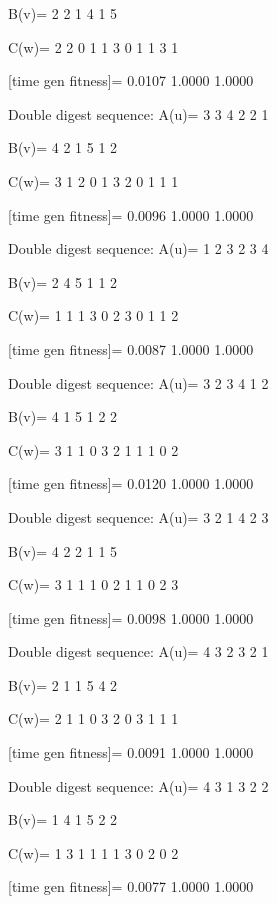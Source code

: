 B(v)=
     2     2     1     4     1     5

C(w)=
     2     2     0     1     1     3     0     1     1     3     1

[time gen fitness]=
    0.0107    1.0000    1.0000

Double digest sequence:
A(u)=
     3     3     4     2     2     1

B(v)=
     4     2     1     5     1     2

C(w)=
     3     1     2     0     1     3     2     0     1     1     1

[time gen fitness]=
    0.0096    1.0000    1.0000

Double digest sequence:
A(u)=
     1     2     3     2     3     4

B(v)=
     2     4     5     1     1     2

C(w)=
     1     1     1     3     0     2     3     0     1     1     2

[time gen fitness]=
    0.0087    1.0000    1.0000

Double digest sequence:
A(u)=
     3     2     3     4     1     2

B(v)=
     4     1     5     1     2     2

C(w)=
     3     1     1     0     3     2     1     1     1     0     2

[time gen fitness]=
    0.0120    1.0000    1.0000

Double digest sequence:
A(u)=
     3     2     1     4     2     3

B(v)=
     4     2     2     1     1     5

C(w)=
     3     1     1     1     0     2     1     1     0     2     3

[time gen fitness]=
    0.0098    1.0000    1.0000

Double digest sequence:
A(u)=
     4     3     2     3     2     1

B(v)=
     2     1     1     5     4     2

C(w)=
     2     1     1     0     3     2     0     3     1     1     1

[time gen fitness]=
    0.0091    1.0000    1.0000

Double digest sequence:
A(u)=
     4     3     1     3     2     2

B(v)=
     1     4     1     5     2     2

C(w)=
     1     3     1     1     1     1     3     0     2     0     2

[time gen fitness]=
    0.0077    1.0000    1.0000

